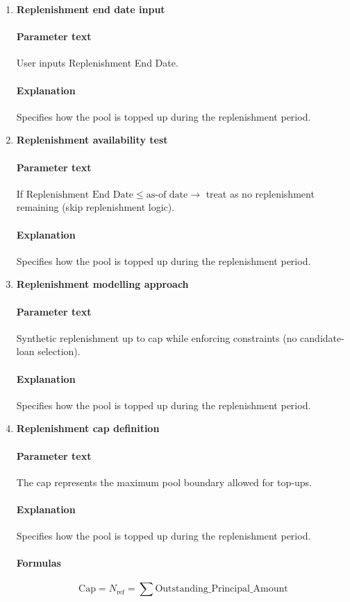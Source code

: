\documentclass[11pt]{article}
\begin{document}
\begin{enumerate}[label=\arabic*),leftmargin=*,align=left]
\item \textbf{Replenishment end date input}
\paragraph{Parameter text} User inputs Replenishment End Date.
\paragraph{Explanation} Specifies how the pool is topped up during the replenishment period.

\item \textbf{Replenishment availability test}
\paragraph{Parameter text} If $\text{Replenishment End Date} \le \text{as-of date} \rightarrow$ treat as no replenishment remaining (skip replenishment logic).
\paragraph{Explanation} Specifies how the pool is topped up during the replenishment period.

\item \textbf{Replenishment modelling approach}
\paragraph{Parameter text} Synthetic replenishment up to cap while enforcing constraints (no candidate-loan selection).
\paragraph{Explanation} Specifies how the pool is topped up during the replenishment period.

\item \textbf{Replenishment cap definition}
\paragraph{Parameter text} The cap represents the maximum pool boundary allowed for top-ups.
\paragraph{Explanation} Specifies how the pool is topped up during the replenishment period.
\paragraph{Formulas} 
\[ \text{Cap} = N_{\text{ref}} = \sum \text{Outstanding\_Principal\_Amount} \]


\end{enumerate}
\end{document}
